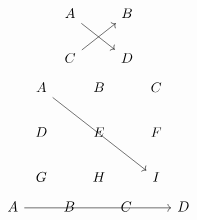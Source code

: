 \documentclass{article}
\begin{document}
\[
\begin{tikzcd}
A \arrow[rd] & B \\
C \arrow[ru] & D
\end{tikzcd}
\]
\[
\begin{tikzcd}
A \arrow[rrdd] & B & C \\
D & E & F \\
G & H & I
\end{tikzcd}
\]
\[
\begin{tikzcd}
A \arrow[rrr] & B & C & D
\end{tikzcd}
\]
\end{document}
